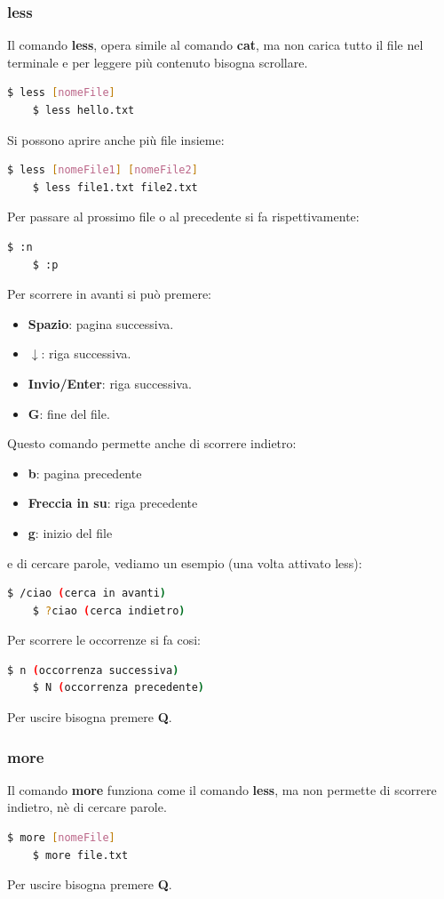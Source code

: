 \documentclass[12pt,a4paper]{article}
\begin{document}
\subsubsection{less}
Il comando \textbf{less}, opera simile al comando \textbf{cat}, ma non carica tutto il file nel terminale e per leggere più contenuto bisogna scrollare.
\begin{lstlisting}[language=bash]
    $ less [nomeFile]
    $ less hello.txt
\end{lstlisting}
Si possono aprire anche più file insieme:
\begin{lstlisting}[language=bash]
    $ less [nomeFile1] [nomeFile2]
    $ less file1.txt file2.txt
\end{lstlisting}
Per passare al prossimo file o al precedente si fa rispettivamente:
\begin{lstlisting}[language=bash]
    $ :n
    $ :p
\end{lstlisting}
Per scorrere in avanti si può premere:
\begin{itemize}
    \item \textbf{Spazio}: pagina successiva.
    \item \textbf{$\downarrow$}: riga successiva.
    \item \textbf{Invio/Enter}: riga successiva.
    \item \textbf{G}: fine del file.
\end{itemize}
Questo comando permette anche di scorrere indietro:
\begin{itemize}
    \item \textbf{b}: pagina precedente
    \item \textbf{Freccia in su}: riga precedente
    \item \textbf{g}: inizio del file
\end{itemize}
e di cercare parole, vediamo un esempio (una volta attivato less):
\begin{lstlisting}[language=bash]
    $ /ciao (cerca in avanti)
    $ ?ciao (cerca indietro)
\end{lstlisting}
Per scorrere le occorrenze si fa cosi:
\begin{lstlisting}[language=bash]
    $ n (occorrenza successiva)
    $ N (occorrenza precedente)
\end{lstlisting}
Per uscire bisogna premere \textbf{Q}.
\subsubsection{more}
Il comando \textbf{more} funziona come il comando \textbf{less}, ma non permette di scorrere indietro, nè di cercare parole.
\begin{lstlisting}[language=bash]
    $ more [nomeFile]
    $ more file.txt
\end{lstlisting}
Per uscire bisogna premere \textbf{Q}.\\
\end{document}
